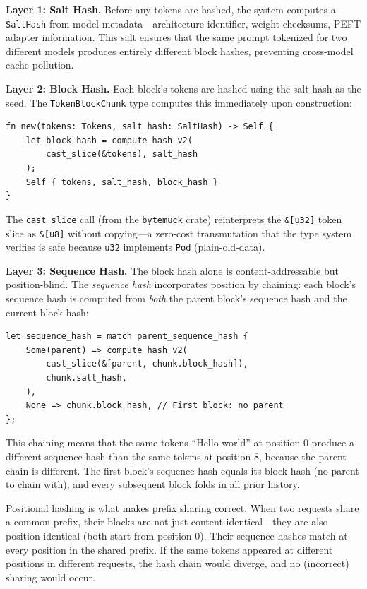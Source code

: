 \textbf{Layer 1: Salt Hash.}\hspace{1em} Before any tokens are hashed, the system computes a \texttt{SaltHash} from model metadata---architecture identifier, weight checksums, PEFT adapter information. This salt ensures that the same prompt tokenized for two different models produces entirely different block hashes, preventing cross-model cache pollution.

\textbf{Layer 2: Block Hash.}\hspace{1em} Each block's tokens are hashed using the salt hash as the seed. The \texttt{TokenBlockChunk} type computes this immediately upon construction:

\begin{verbatim}
fn new(tokens: Tokens, salt_hash: SaltHash) -> Self {
    let block_hash = compute_hash_v2(
        cast_slice(&tokens), salt_hash
    );
    Self { tokens, salt_hash, block_hash }
}
\end{verbatim}

The \texttt{cast\_slice} call (from the \texttt{bytemuck} crate) reinterprets the \texttt{\&[u32]} token slice as \texttt{\&[u8]} without copying---a zero-cost transmutation that the type system verifies is safe because \texttt{u32} implements \texttt{Pod} (plain-old-data).

\textbf{Layer 3: Sequence Hash.}\hspace{1em} The block hash alone is content-addressable but position-blind. The \emph{sequence hash} incorporates position by chaining: each block's sequence hash is computed from \emph{both} the parent block's sequence hash and the current block hash:

\begin{verbatim}
let sequence_hash = match parent_sequence_hash {
    Some(parent) => compute_hash_v2(
        cast_slice(&[parent, chunk.block_hash]),
        chunk.salt_hash,
    ),
    None => chunk.block_hash, // First block: no parent
};
\end{verbatim}

This chaining means that the same tokens ``Hello world'' at position 0 produce a different sequence hash than the same tokens at position 8, because the parent chain is different. The first block's sequence hash equals its block hash (no parent to chain with), and every subsequent block folds in all prior history.

\begin{insightbox}
Positional hashing is what makes prefix sharing correct. When two requests share a common prefix, their blocks are not just content-identical---they are also position-identical (both start from position 0). Their sequence hashes match at every position in the shared prefix. If the same tokens appeared at different positions in different requests, the hash chain would diverge, and no (incorrect) sharing would occur.
\end{insightbox}

